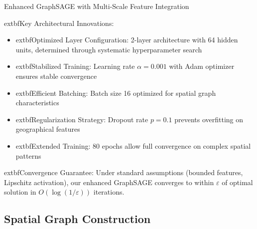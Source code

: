 \documentclass[twocolumn,11pt]{IEEEtran}  %
\begin{document}
\begin{algorithm}
\caption{Enhanced GraphSAGE with Multi-Scale Feature Integration}
\label{alg:enhanced_graphsage}
\begin{algorithmic}[1]
    \ENDFOR
\ENDFOR
{}
\end{algorithmic}
\end{algorithm}

	extbf{Key Architectural Innovations:}
\begin{itemize}
\item 	extbf{Optimized Layer Configuration:} 2-layer architecture with 64 hidden units, determined through systematic hyperparameter search
\item 	extbf{Stabilized Training:} Learning rate $\alpha = 0.001$ with Adam optimizer ensures stable convergence
\item 	extbf{Efficient Batching:} Batch size 16 optimized for spatial graph characteristics
\item 	extbf{Regularization Strategy:} Dropout rate $p = 0.1$ prevents overfitting on geographical features
\item 	extbf{Extended Training:} 80 epochs allow full convergence on complex spatial patterns
\end{itemize}

	extbf{Convergence Guarantee:} Under standard assumptions (bounded features, Lipschitz activation), our enhanced GraphSAGE converges to within $\varepsilon$ of optimal solution in $O(\log(1/\varepsilon))$ iterations.

\subsection{Spatial Graph Construction}
\end{document}
